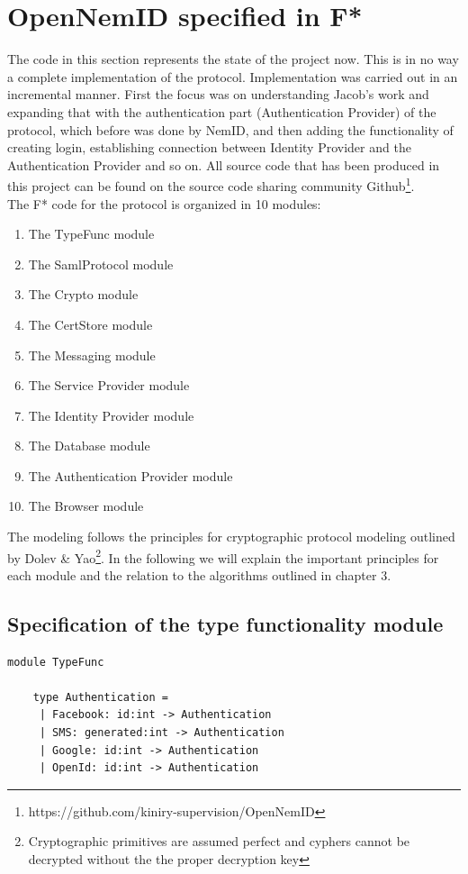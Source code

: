 \documentclass[twosided]{report}
\begin{document}
\section{OpenNemID specified in F*}
The code in this section represents the state of the project now. This is in no way a complete implementation of the protocol. Implementation was carried out in an incremental manner. First the focus was on understanding Jacob's work and expanding that with the authentication part (Authentication Provider) of the protocol, which before was done by NemID, and then adding the functionality of creating login, establishing connection between Identity Provider and the Authentication Provider and so on. All source code that has been produced in this project can be found on the source code sharing community Github\footnote{https://github.com/kiniry-supervision/OpenNemID}.
\\The F* code for the protocol is organized in 10 modules:
\begin{enumerate}
	\item The TypeFunc module
	\item The SamlProtocol module
	\item The Crypto module
	\item The CertStore module
	\item The Messaging module
	\item The Service Provider module
	\item The Identity Provider module
	\item The Database module
	\item The Authentication Provider module
	\item The Browser module
\end{enumerate}
The modeling follows the principles for cryptographic protocol modeling outlined by Dolev \& Yao\footnote{Cryptographic primitives are assumed perfect and cyphers cannot be decrypted without the the proper decryption key}. In the following we will explain the important principles for each module and the relation to the algorithms outlined in chapter 3.
\subsection{Specification of the type functionality module}

\begin{lstlisting}[style=fstar, caption={TypeFunc module}]
	module TypeFunc

	type Authentication =
 	 | Facebook: id:int -> Authentication
 	 | SMS: generated:int -> Authentication
	 | Google: id:int -> Authentication
	 | OpenId: id:int -> Authentication
\end{lstlisting}
\end{document}
